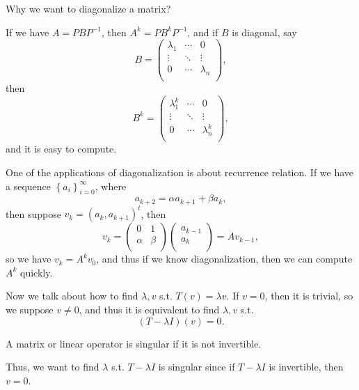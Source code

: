 \begin{question}
    Why we want to diagonalize a matrix?
\end{question}
\begin{answer}
   If we have \(A = P B P^{-1} \), then \(A^k = P B^k P^{-1}\), and if \(B\) is diagonal, say 
   \[
    B = \begin{pmatrix}
        \lambda _1 & \cdots & 0  \\
         \vdots & \ddots & \vdots  \\
         0 & \cdots & \lambda _n  \\
    \end{pmatrix},
   \] then 
   \[
    B^k = \begin{pmatrix}
        \lambda _1^k & \cdots & 0  \\
         \vdots & \ddots & \vdots  \\
         0 & \cdots & \lambda _n^k  \\
    \end{pmatrix}, 
   \] and it is easy to compute.
\end{answer}

One of the applications of diagonalization is about recurrence relation. If we have a sequence \(\left\{ a_i \right\}_{i=0}^{\infty}  \), where 
\[
    a_{k+2} = \alpha a_{k+1} + \beta a_{k},
\] then suppose \(v_k = (a_k, a_{k+1})^t\), then 
\[
    v_k = \begin{pmatrix}
        0 & 1  \\
        \alpha  & \beta   \\
    \end{pmatrix} \begin{pmatrix}
         a_{k-1} \\
         a_k \\
    \end{pmatrix} = A v_{k-1},
\] so we have \(v_k = A^k v_0\), and thus if we know diagonalization, then we can compute \(A^k\) quickly.

Now we talk about how to find \(\lambda , v\) s.t. \(T(v) = \lambda v\). If \(v = 0\), then it is trivial, so we suppose \(v \neq 0\), and thus it is equivalent to find \(\lambda , v\) s.t. 
\[
    (T - \lambda I)(v) = 0.
\] 
\begin{definition}[Singular]
    A matrix or linear operator is singular if it is not invertible.
\end{definition}    

Thus, we want to find \(\lambda \) s.t. \(T - \lambda I\) is singular since if \(T - \lambda I\) is invertible, then \(v = 0\). 

